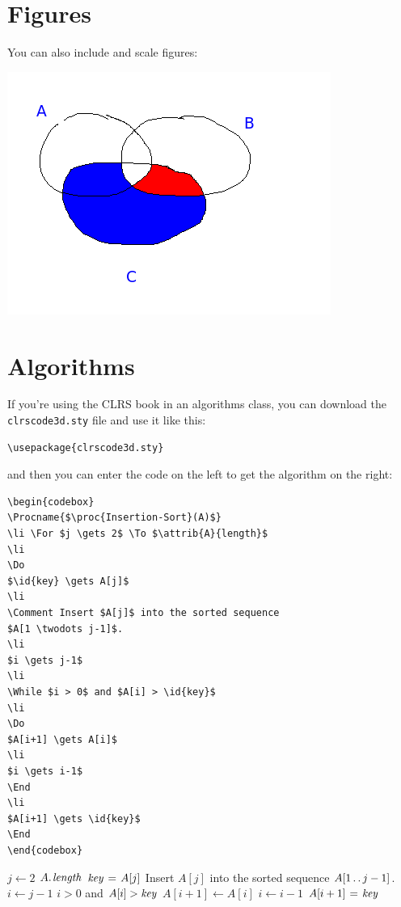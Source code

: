 \documentclass{article}
\begin{document}
\section{Figures}
You can also include and scale figures:

\includegraphics[scale=0.5]{sets.png}

\section{Algorithms}


  If you're using the CLRS book in an algorithms class, you can
download the {\tt clrscode3d.sty} file and use it like this:
\begin{Verbatim}[frame=single]
  \usepackage{clrscode3d.sty}
  \end{Verbatim}
\begin{minipage}{0.575\textwidth}
and then you can enter the code on the left to get the algorithm on the right:
\begin{Verbatim}[frame=single]
\begin{codebox}
\Procname{$\proc{Insertion-Sort}(A)$}
\li \For $j \gets 2$ \To $\attrib{A}{length}$
\li
\Do
$\id{key} \gets A[j]$
\li
\Comment Insert $A[j]$ into the sorted sequence
$A[1 \twodots j-1]$.
\li
$i \gets j-1$
\li
\While $i > 0$ and $A[i] > \id{key}$
\li
\Do
$A[i+1] \gets A[i]$
\li
$i \gets i-1$
\End
\li
$A[i+1] \gets \id{key}$
\End
\end{codebox}
\end{Verbatim}
\end{minipage}
\begin{minipage}{0.475\textwidth}
\begin{codebox}
\li \For $j \gets 2$ \To $\attrib{A}{length}$
\li
\Do
$\id{key} \gets A[j]$
\li
\Comment Insert $A[j]$ into the sorted sequence
$A[1 \mathinner{\ldotp\ldotp} j-1]$.
\li
$i \gets j-1$
\li
\While $i > 0$ and $A[i] > \id{key}$
\li
\Do
$A[i+1] \gets A[i]$
\li
$i \gets i-1$
\End
\li
$A[i+1] \gets \id{key}$
\End
\end{codebox}
\end{minipage}
\end{document}
